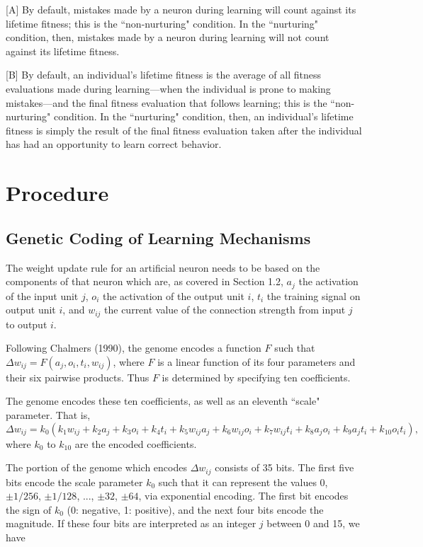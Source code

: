 \documentclass[master]{outhesis}
\begin{document}
[A] By default, mistakes made by a neuron during learning will count against its lifetime fitness; this is the ``non-nurturing" condition.
In the ``nurturing" condition, then, mistakes made by a neuron during learning will not count against its lifetime fitness.

[B] By default, an individual's lifetime fitness is the average of all fitness evaluations made during learning---when the individual is prone to making mistakes---and the final fitness evaluation that follows learning; this is the ``non-nurturing" condition.
In the ``nurturing" condition, then, an individual's lifetime fitness is simply the result of the final fitness evaluation taken after the individual has had an opportunity to learn correct behavior.

\chapter{Procedure}

\section{Genetic Coding of Learning Mechanisms}

The weight update rule for an artificial neuron needs to be based on the components of that neuron which are, as covered in Section 1.2, $a_j$ the activation of the input unit $j$, $o_i$ the activation of the output unit $i$, $t_i$ the training signal on output unit $i$, and $w_{ij}$ the current value of the connection strength from input $j$ to output $i$.

Following Chalmers (1990), the genome encodes a function $F$ such that $\Delta w_{ij} = F(a_j, o_i, t_i, w_{ij})$, where $F$ is a linear function of its four parameters and their six pairwise products. Thus $F$ is determined by specifying ten coefficients.

The genome encodes these ten coefficients, as well as an eleventh ``scale" parameter. That is,
\[
	\Delta w_{ij} = k_0(k_1w_{ij}+k_2a_j+k_3o_i+k_4t_i+k_5w_{ij}a_j+k_6w_{ij}o_i+k_7w_{ij}t_{i}+k_8a_jo_i+k_9a_jt_i+k_{10}o_it_i),
\]
where $k_0$ to $k_10$ are the encoded coefficients.

The portion of the genome which encodes $\Delta w_{ij}$ consists of 35 bits. The first five bits encode the scale parameter $k_0$ such that it can represent the values $0$, $\pm 1/256$, $\pm 1/128$, ..., $\pm 32$, $\pm 64$, via exponential encoding. The first bit encodes the sign of $k_0$ (0: negative, 1: positive), and the next four bits encode the magnitude. If these four bits are interpreted as an integer $j$ between 0 and 15, we have
\end{document}
